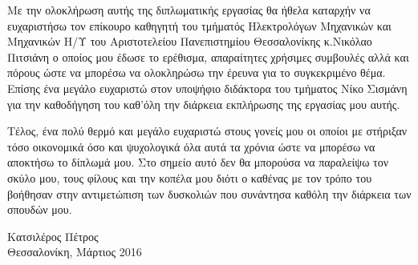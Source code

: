 
\cleardoublepage


\begin{acknowledgements}

\par Με την ολοκλήρωση αυτής της διπλωματικής εργασίας θα ήθελα καταρχήν να ευχαριστήσω τον επίκουρο καθηγητή του τμήματός Ηλεκτρολόγων Μηχανικών και Μηχανικών Η/Υ του Αριστοτελείου Πανεπιστημίου Θεσσαλονίκης κ.Νικόλαο Πιτσιάνη ο οποίος μου έδωσε το ερέθισμα, απαραίτητες χρήσιμες συμβουλές αλλά και πόρους ώστε να μπορέσω να ολοκληρώσω την έρευνα για το συγκεκριμένο θέμα. Επίσης ένα μεγάλο ευχαριστώ στον υποψήφιο διδάκτορα του τμήματος Νίκο Σισμάνη για την καθοδήγηση του καθ'όλη την διάρκεια εκπλήρωσης της εργασίας μου αυτής. 

\par Τέλος, ένα πολύ θερμό και μεγάλο ευχαριστώ στους γονείς μου οι οποίοι με στήριξαν τόσο οικονομικά όσο και ψυχολογικά όλα αυτά τα χρόνια ώστε να μπορέσω να αποκτήσω το δίπλωμά μου. Στο σημείο αυτό δεν θα μπορούσα να παραλείψω τον σκύλο μου, τους φίλους και την κοπέλα μου διότι ο καθένας με τον τρόπο του βοήθησαν στην αντιμετώπιση των δυσκολιών που συνάντησα καθόλη την διάρκεια των σπουδών μου.

\begin{flushright}
Κατσιλέρος Πέτρος \\
Θεσσαλονίκη, Μάρτιος 2016
\end{flushright}

\end{acknowledgements}
